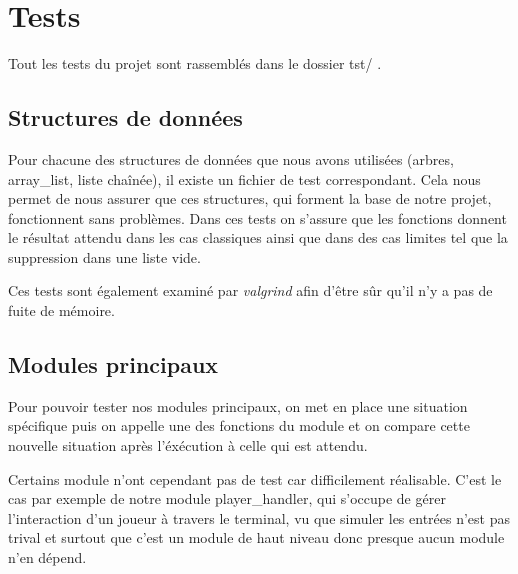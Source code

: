 \section{Tests}

Tout les tests du projet sont rassemblés dans le dossier tst/ . 

\subsection{Structures de données}
Pour chacune des structures de données que nous avons utilisées (arbres, array\_list, liste chaînée),
il existe un fichier de test correspondant. Cela nous permet de nous assurer que ces structures, qui
forment la base de notre projet, fonctionnent sans problèmes. Dans ces tests on s'assure que les fonctions
donnent le résultat attendu dans les cas classiques ainsi que dans des cas limites tel que la suppression 
dans une liste vide. 

Ces tests sont également examiné par \emph{valgrind} afin d'être sûr qu'il n'y a pas 
de fuite de mémoire.

\subsection{Modules principaux}
Pour pouvoir tester nos modules principaux, on met en place une situation spécifique puis on appelle une des 
fonctions du module et on compare cette nouvelle situation après l'éxécution à celle qui est attendu.

Certains module n'ont cependant pas de test car difficilement réalisable. C'est le cas par exemple de notre
module player\_handler, qui s'occupe de gérer l'interaction d'un joueur à travers le terminal, vu que simuler
les entrées n'est pas trival et surtout que c'est un module de haut niveau donc presque aucun module n'en dépend.


